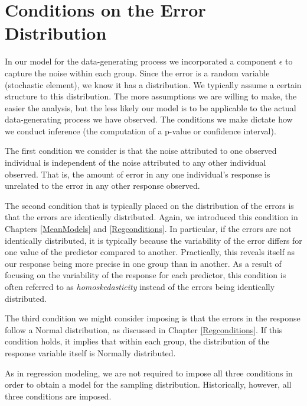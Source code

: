 \documentclass[
]{book}
\theoremstyle{plain}
\theoremstyle{mydefn}
\theoremstyle{myexmpl}
\theoremstyle{remark}
\begin{document}
\hypertarget{conditions-on-the-error-distribution-1}{%
\section{Conditions on the Error Distribution}\label{conditions-on-the-error-distribution-1}}

In our model for the data-generating process we incorporated a component \(\epsilon\) to capture the noise within each group. Since the error is a random variable (stochastic element), we know it has a distribution. We typically assume a certain structure to this distribution. The more assumptions we are willing to make, the easier the analysis, but the less likely our model is to be applicable to the actual data-generating process we have observed. The conditions we make dictate how we conduct inference (the computation of a p-value or confidence interval).

The first condition we consider is that the noise attributed to one observed individual is independent of the noise attributed to any other individual observed. That is, the amount of error in any one individual's response is unrelated to the error in any other response observed.

The second condition that is typically placed on the distribution of the errors is that the errors are identically distributed. Again, we introduced this condition in Chapters \ref{MeanModels} and \ref{Regconditions}. In particular, if the errors are not identically distributed, it is typically because the variability of the error differs for one value of the predictor compared to another. Practically, this reveals itself as our response being more precise in one group than in another. As a result of focusing on the variability of the response for each predictor, this condition is often referred to as \emph{homoskedasticity} instead of the errors being identically distributed.

The third condition we might consider imposing is that the errors in the response follow a Normal distribution, as discussed in Chapter \ref{Regconditions}. If this condition holds, it implies that within each group, the distribution of the response variable itself is Normally distributed.

As in regression modeling, we are not required to impose all three conditions in order to obtain a model for the sampling distribution. Historically, however, all three conditions are imposed.
\end{document}
